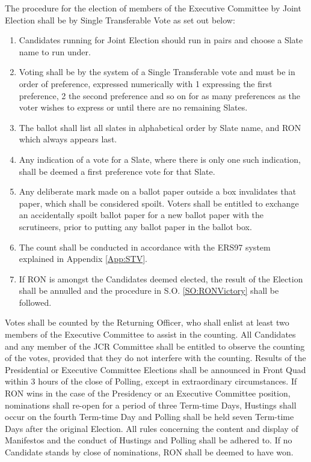 \npara The procedure for the election of members of the Executive Committee by Joint Election shall be by Single Transferable Vote as set out below:
\begin{enumerate}
\item Candidates running for Joint Election should run in pairs and choose a Slate name to run under.
\item Voting shall be by the system of a Single Transferable vote and must be in order of preference, expressed numerically with 1 expressing the first preference, 2 the second preference and so on for as many preferences as the voter wishes to express or until there are no remaining Slates.
\item The ballot shall list all slates in alphabetical order by Slate name, and RON which always appears last.
\item Any indication of a vote for a Slate, where there is only one such indication, shall be deemed a first preference vote for that Slate.
\item Any deliberate mark made on a ballot paper outside a box invalidates that paper, which shall be considered spoilt.
Voters shall be entitled to exchange an accidentally spoilt ballot paper for a new ballot paper with the scrutineers, prior to putting any ballot paper in the ballot box.
\item The count shall be conducted in accordance with the ERS97 system explained in Appendix \ref{App:STV}.
\item If RON is amongst the Candidates deemed elected, the result of the Election shall be annulled and the procedure in S.O. \ref{SO:RONVictory} shall be followed.
\end{enumerate}
\npara Votes shall be counted by the Returning Officer, who shall enlist at least two members of the Executive Committee to assist in the counting.
\npara All Candidates and any member of the JCR Committee shall be entitled to observe the counting of the votes, provided that they do not interfere with the counting.
\npara Results of the Presidential or Executive Committee Elections shall be announced in Front Quad within 3 hours of the close of Polling, except in extraordinary circumstances.
\npara \label{SO:RONVictory} If RON wins in the case of the Presidency or an Executive Committee position, nominations shall re-open for a period of three Term-time Days, Hustings shall occur on the fourth Term-time Day and Polling shall be held seven Term-time Days after the original Election. All rules concerning the content and display of Manifestos and the conduct of Hustings and Polling shall be adhered to.
\npara If no Candidate stands by close of nominations, RON shall be deemed to have won.
